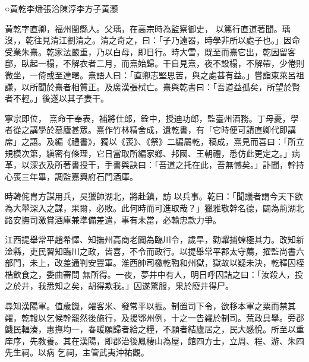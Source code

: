 
\begin{pinyinscope}

 ○黃乾李燔張洽陳淳李方子黃灝



 黃乾字直卿，福州閩縣人。父瑀，在高宗時為監察御史，
 以篤行直道著聞。瑀沒，，乾往見清江劉清之。清之奇之，曰：「子乃遠器，時學非所以處子也。」因命受業朱熹。乾家法嚴重，乃以白母，即日行。時大雪，既至而熹它出，乾因留客邸，臥起一榻，不解衣者二月，而熹始歸。干自見熹，夜不設榻，不解帶，少倦則微坐，一倚或至達曙。熹語人曰：「直卿志堅思苦，與之處甚有益。」嘗詣東萊呂祖謙，以所聞於熹者相質正。及廣漢張栻亡。熹與乾書曰：「吾道益孤矣，所望於賢者不輕。」後遂以其子妻干。



 寧宗即位，
 熹命干奉表，補將仕郎，銓中，授迪功郎，監臺州酒務。丁母憂，學者從之講學於墓廬甚眾。熹作竹林精舍成，遺乾書，有「它時便可請直卿代即講席」之語。及編《禮書》，獨以《喪》、《祭》二編屬乾，稿成，熹見而喜曰：「所立規模次第，縝密有條理，它日當取所編家鄉、邦國、王朝禮，悉仿此更定之。」病革，以深衣及所著書授干，手書與訣曰：「吾道之托在此，吾無憾矣。」訃聞，幹持心喪三年畢，調監嘉興府石門酒庫。



 時韓侂胄方謀用兵，吳獵帥湖北，將赴鎮，訪
 以兵事。乾曰：「聞議者謂今天下欲為大舉深入之謀，果爾，必敗。此何時而可進取哉？」獵雅敬幹名德，闢為荊湖北路安撫司激賞酒庫兼準備差遣，事有未當，必輸忠款力爭。



 江西提舉常平趙希懌、知撫州高商老闢為臨川令，歲旱，勸糶捕蝗極其力。改知新淦縣，吏民習知臨川之政，皆喜，不令而政行。以提舉常平郡太守薦，擢監尚書六部門，未上，改差通判安豐軍。淮西帥司檄乾鞫和州獄，獄故以疑未決，乾釋囚桎梏飲食之，委曲審問
 無所得。一夜，夢井中有人，明日呼囚詰之曰：「汝殺人，投之於井，我悉知之矣，胡得欺我。」囚遂驚服，果於廢井得尸。



 尋知漢陽軍。值歲饑，糴客米、發常平以振。制置司下令，欲移本軍之粟而禁其糴，乾報以乞候幹罷然後施行，及援鄂州例，十之一告糴於制司。荒政具舉。旁郡饑民輻湊，惠撫均一，春暖願歸者給之糧，不願者結廬居之，民大感悅。所至以重庠序，先教養。其在漢陽，即郡治後鳳棲山為屋，館四方士，立周、程、游、朱四先生祠。以病
 乞祠，主管武夷沖祐觀。




\end{pinyinscope}
